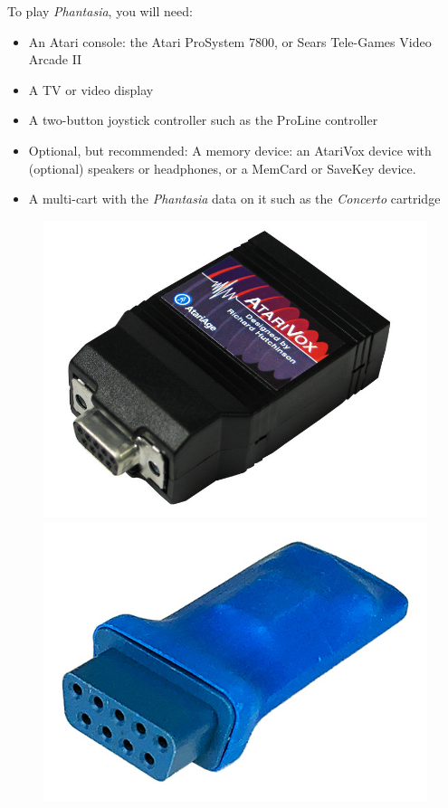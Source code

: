 \documentclass[10pt,twocolumn,openany,article]{memoir}
\begin{document}
To play \textit{Phantasia}, you will need:

\begin{itemize}
\item An Atari console: the Atari ProSystem 7800, or Sears
  Tele-Games Video Arcade II
\item A TV or video display
\item A two-button joystick controller such as the ProLine controller
\item Optional,  but recommended:  A memory  device: an  AtariVox device
  with  (optional)  speakers or  headphones,  or  a MemCard  or  SaveKey
  device.
\item A  multi-cart with the  \textit{Phantasia} data  on it such  as the
  \textit{Concerto} cartridge
\end{itemize}

\begin{figure}[b]
  \begin{center}
    \includegraphics[width=\columnwidth]{../Manual/AtariVox.jpeg}
    \includegraphics[width=\columnwidth]{../Manual/SaveKey.jpeg}
  \end{center}
\end{figure}
\end{document}
